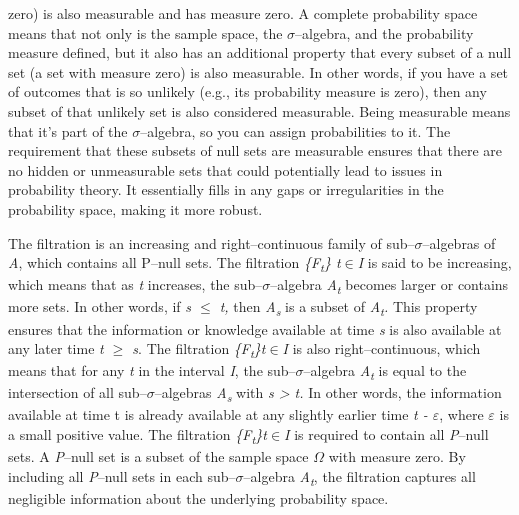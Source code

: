 \documentclass[12pt,a4paper]{report}
\numberwithin{equation}{section}
\begin{document}
zero) is also measurable and has measure zero. A complete probability
space means that not only is the sample space, the $\sigma$--algebra, and the
probability measure defined, but it also has an additional property that
every subset of a null set (a set with measure zero) is also measurable.
In other words, if you have a set of outcomes that is so unlikely (e.g.,
its probability measure is zero), then any subset of that unlikely set
is also considered measurable. Being measurable means that it's part of
the $\sigma$--algebra, so you can assign probabilities to it. The requirement
that these subsets of null sets are measurable ensures that there are no
hidden or unmeasurable sets that could potentially lead to issues in
probability theory. It essentially fills in any gaps or irregularities
in the probability space, making it more robust.

The filtration is an increasing and right--continuous family of
sub--$\sigma$--algebras of \emph{A}, which contains all P--null sets. The
filtration \emph{\{F\textsubscript{t}\} t$\in$I} is said to be increasing,
which means that as \emph{t} increases, the sub--$\sigma$--algebra
\emph{A\textsubscript{t}} becomes larger or contains more sets. In other
words, if \emph{s $\leq$ t,} then \emph{A\textsubscript{s}} is a subset of
\emph{A\textsubscript{t}.} This property ensures that the information or
knowledge available at time \emph{s} is also available at any later time
\emph{t $\geq$ s}. The filtration \emph{\{F\textsubscript{t}\}t$\in$I} is also
right--continuous, which means that for any \emph{t} in the interval
\emph{I}, the sub--$\sigma$--algebra \emph{A\textsubscript{t}} is equal to the
intersection of all sub--$\sigma$--algebras \emph{A\textsubscript{s}} with
\emph{s \textgreater{} t.} In other words, the information available at
time t is already available at any slightly earlier time \emph{t - $\varepsilon$},
where \emph{$\varepsilon$} is a small positive value. The filtration
\emph{\{F\textsubscript{t}\}t$\in$I} is required to contain all
\emph{P}--null sets. A \emph{P}--null set is a subset of the sample space
\emph{$\Omega$} with measure zero. By including all \emph{P}--null sets in each
sub--$\sigma$--algebra \emph{A\textsubscript{t}}, the filtration captures all
negligible information about the underlying probability space.
\end{document}
